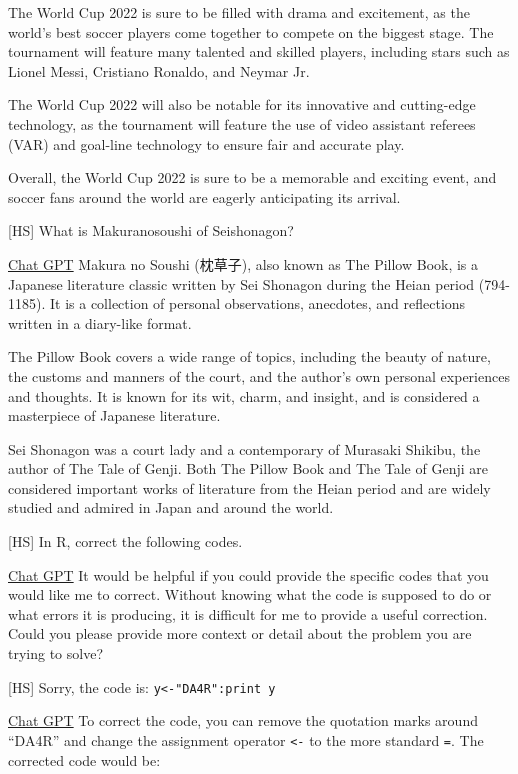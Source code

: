 \documentclass[
]{bxjsbook}
\theoremstyle{definition}
\theoremstyle{definition}
\theoremstyle{definition}
\theoremstyle{definition}
\theoremstyle{remark}
\begin{document}
The World Cup 2022 is sure to be filled with drama and excitement, as the world's best soccer players come together to compete on the biggest stage. The tournament will feature many talented and skilled players, including stars such as Lionel Messi, Cristiano Ronaldo, and Neymar Jr.

The World Cup 2022 will also be notable for its innovative and cutting-edge technology, as the tournament will feature the use of video assistant referees (VAR) and goal-line technology to ensure fair and accurate play.

Overall, the World Cup 2022 is sure to be a memorable and exciting event, and soccer fans around the world are eagerly anticipating its arrival.

{[}HS{]} What is Makuranosoushi of Seishonagon?

\protect\hyperlink{chatgpt}{Chat GPT} Makura no Soushi (枕草子), also known as The Pillow Book, is a Japanese literature classic written by Sei Shonagon during the Heian period (794-1185). It is a collection of personal observations, anecdotes, and reflections written in a diary-like format.

The Pillow Book covers a wide range of topics, including the beauty of nature, the customs and manners of the court, and the author's own personal experiences and thoughts. It is known for its wit, charm, and insight, and is considered a masterpiece of Japanese literature.

Sei Shonagon was a court lady and a contemporary of Murasaki Shikibu, the author of The Tale of Genji. Both The Pillow Book and The Tale of Genji are considered important works of literature from the Heian period and are widely studied and admired in Japan and around the world.

{[}HS{]} In R, correct the following codes.

\protect\hyperlink{chatgpt}{Chat GPT} It would be helpful if you could provide the specific codes that you would like me to correct. Without knowing what the code is supposed to do or what errors it is producing, it is difficult for me to provide a useful correction. Could you please provide more context or detail about the problem you are trying to solve?

{[}HS{]} Sorry, the code is: \texttt{y\textless{}-"DA4R":print\ y}

\protect\hyperlink{chatgpt}{Chat GPT} To correct the code, you can remove the quotation marks around ``DA4R'' and change the assignment operator \texttt{\textless{}-} to the more standard \texttt{=}. The corrected code would be:
\end{document}
